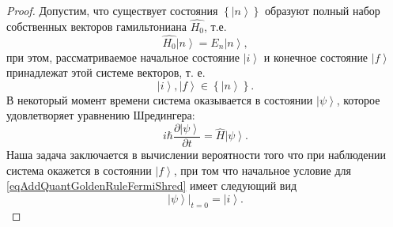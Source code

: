 \begin{proof}
  Допустим, что существует состояния
  $\left\{\left|n\right>\right\}$ образуют полный набор собственных
  векторов гамильтониана $\hat{H_0}$, т.е.
  \begin{equation}
    \hat{H_0} \left| n \right> = E_n \left| n \right>,
    \nonumber
  \end{equation}
  при этом, рассматриваемое начальное состояние  $\left|i\right>$ и
  конечное состояние $\left|f\right>$ принадлежат этой системе
  векторов, т. е.
  \begin{equation}
    \left|i\right>, \left|f\right> \in \left\{\left|n\right>\right\}.
    \nonumber
  \end{equation}
  В некоторый момент времени система оказывается в состоянии
  $\left|\psi\right>$, которое удовлетворяет уравнению Шредингера:
  \begin{equation}
    i \hbar \frac{\partial \left|\psi\right>}{\partial t} =
    \hat{H} \left|\psi\right>.
    \label{eqAddQuantGoldenRuleFermiShred}
  \end{equation}
  Наша задача заключается в вычислении вероятности того что при
  наблюдении система окажется в состоянии $\left|f\right>$, при том
  что начальное условие для \eqref{eqAddQuantGoldenRuleFermiShred}
  имеет следующий вид
  \begin{equation}
    \left.\left|\psi\right>\right|_{t=0} = \left|i\right>.
    \label{eqAddQuantGoldenRuleFermiInitialCond}
  \end{equation}


\end{proof}

